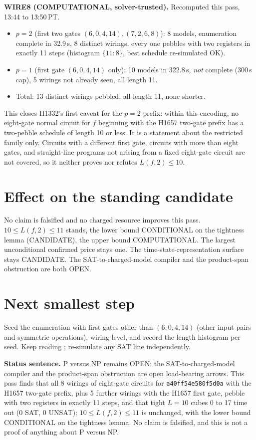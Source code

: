 \documentclass[11pt]{article}
\begin{document}
\textbf{WIRE8 (COMPUTATIONAL, solver-trusted).} Recomputed this pass, 13:44 to 13:50\,PT.
\begin{itemize}
\item $p=2$ (first two gates $(6,0,4,14),(7,2,6,8)$): 8 models, enumeration complete in 32.9\,s, 8 distinct wirings, every one pebbles with two registers in exactly 11 steps (histogram $\{11:8\}$, best schedule re-simulated OK).
\item $p=1$ (first gate $(6,0,4,14)$ only): 10 models in 322.8\,s, \emph{not} complete (300\,s cap), 5 wirings not already seen, all length 11.
\item Total: 13 distinct wirings pebbled, all length 11, none shorter.
\end{itemize}
This closes H1332's first caveat for the $p=2$ prefix: within this encoding, no eight-gate normal circuit for $f$ beginning with the H1657 two-gate prefix has a two-pebble schedule of length 10 or less. It is a statement about the restricted family only. Circuits with a different first gate, circuits with more than eight gates, and straight-line programs not arising from a fixed eight-gate circuit are not covered, so it neither proves nor refutes $L(f,2)\le 10$.

\section*{Effect on the standing candidate}
No claim is falsified and no charged resource improves this pass. $10\le L(f,2)\le 11$ stands, the lower bound CONDITIONAL on the tightness lemma (CANDIDATE), the upper bound COMPUTATIONAL. The largest unconditional confirmed price stays one. The time-state-representation surface stays CANDIDATE. The SAT-to-charged-model compiler and the product-span obstruction are both OPEN.

\section*{Next smallest step}
Seed the enumeration with first gates other than $(6,0,4,14)$ (other input pairs and symmetric operations), wiring-level, and record the length histogram per seed. Keep reading ; re-simulate any SAT line independently.

\bigskip
\noindent\textbf{Status sentence.} P versus NP remains OPEN: the SAT-to-charged-model compiler and the product-span obstruction are open load-bearing arrows. This pass finds that all 8 wirings of eight-gate circuits for \texttt{a40ff54e580f5d0a} with the H1657 two-gate prefix, plus 5 further wirings with the H1657 first gate, pebble with two registers in exactly 11 steps, and that tight $L=10$ cubes 0 to 17 time out (0 SAT, 0 UNSAT); $10\le L(f,2)\le 11$ is unchanged, with the lower bound CONDITIONAL on the tightness lemma. No claim is falsified, and this is not a proof of anything about P versus NP.
\end{document}
